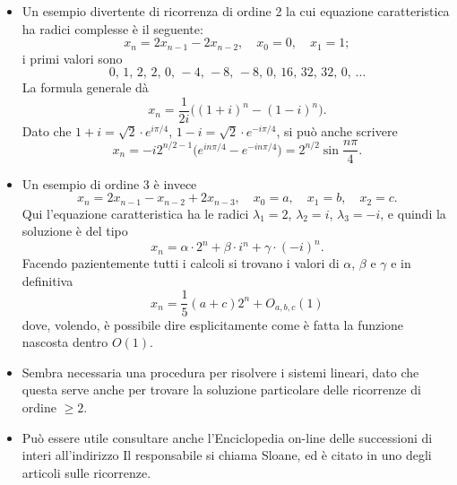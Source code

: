 \documentclass{article}[12]
\begin{document}
\def\dx{{\rm d}}
\def\N{\mathbf N}
\def\Z{\mathbf Z}
\def\R{\mathbf R}
\def\C{\mathbf C}
\def\({\bigl(}
\def\){\bigr)}
\def\dsize{\displaystyle}

\bigskip
{}
\bigskip\noindent
\begin{itemize}
\item Un esempio divertente di ricorrenza di ordine 2 la cui equazione
caratteristica ha radici 
complesse \`e il seguente: 
$$
x_n = 2 x_{n-1} - 2 x_{n-2}, \quad x_0=0, \quad x_1=1;
$$
i primi valori sono 
$$
0,\, 1,\, 2,\, 2,\, 0,\, -4,\, -8,\, -8,\, 0,\, 16,\, 32,\, 32,\, 0,\,
\dots
$$
La formula generale d\`a 
$$
x_n = \frac1 {2i} \( (1+i)^n - (1-i)^n \).
$$
Dato che $1+i=\sqrt2 \cdot e^{i\pi/4}$, $1-i=\sqrt2 \cdot
e^{-i\pi/4}$, si pu\`o anche scrivere 
$$
x_n = -i2^{n/2-1} \( e^{in\pi/4} - e^{-in\pi/4}\)
    = 2^{n/2} \sin\frac{n\pi}4.
$$
\item Un esempio di ordine 3 \`e invece 
$$
x_n = 2 x_{n-1} - x_{n-2} + 2 x_{n-3},\quad x_0=a,\quad x_1=b,\quad
x_2=c.
$$
Qui l'equazione caratteristica ha le radici $\lambda_1=2$,
$\lambda_2=i$, $\lambda_3=-i$, e quindi 
la soluzione \`e del tipo 
$$
x_n = \alpha \cdot 2^n + \beta \cdot i^n + \gamma\cdot(-i)^n.
$$
Facendo pazientemente tutti i calcoli si trovano i valori di
$\alpha$, $\beta$ e $\gamma$ e in 
definitiva 
$$
x_n = \frac15 (a+c) 2^n + O_{a,b,c}(1)
$$
dove, volendo, \`e possibile dire esplicitamente come \`e fatta la
funzione nascosta dentro 
$O(1)$. 
\item Sembra necessaria una procedura per risolvere i sistemi lineari,
dato che questa serve 
anche per trovare la soluzione particolare delle ricorrenze di ordine
$\ge2$. 
\item Pu\`o essere utile consultare anche l'Enciclopedia on-line delle
successioni di interi 
all'indirizzo 
Il responsabile si chiama Sloane, ed \`e citato in uno degli articoli
sulle ricorrenze. 


\end{itemize}
\end{document}
